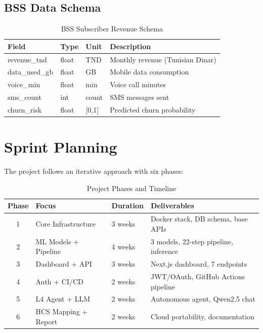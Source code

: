\subsection{BSS Data Schema}

\begin{table}[H]
\centering
\caption{BSS Subscriber Revenue Schema}
\label{tab:bss-schema}
\begin{tabular}{@{}llll@{}}
\toprule
\textbf{Field} & \textbf{Type} & \textbf{Unit} & \textbf{Description} \\
\midrule
revenue\_tnd & float & TND & Monthly revenue (Tunisian Dinar) \\
data\_used\_gb & float & GB & Mobile data consumption \\
voice\_min & float & min & Voice call minutes \\
sms\_count & int & count & SMS messages sent \\
churn\_risk & float & [0,1] & Predicted churn probability \\
\bottomrule
\end{tabular}
\end{table}

\section{Sprint Planning}

The project follows an iterative approach with six phases:

\begin{table}[H]
\centering
\caption{Project Phases and Timeline}
\label{tab:phases}
\begin{tabular}{@{}clll@{}}
\toprule
\textbf{Phase} & \textbf{Focus} & \textbf{Duration} & \textbf{Deliverables} \\
\midrule
1 & Core Infrastructure & 3 weeks & Docker stack, DB schema, base APIs \\
2 & ML Models + Pipeline & 4 weeks & 3 models, 22-step pipeline, inference \\
3 & Dashboard + API & 3 weeks & Next.js dashboard, 7 endpoints \\
4 & Auth + CI/CD & 2 weeks & JWT/OAuth, GitHub Actions pipeline \\
5 & L4 Agent + LLM & 2 weeks & Autonomous agent, Qwen2.5 chat \\
6 & HCS Mapping + Report & 2 weeks & Cloud portability, documentation \\
\bottomrule
\end{tabular}
\end{table}
